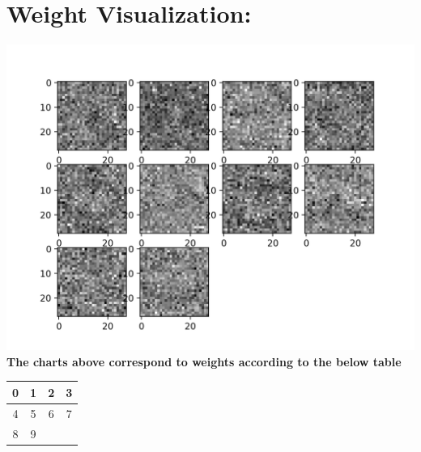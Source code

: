 \documentclass[12pt, letterpaper, notitlepage, twoside]{article}
\theoremstyle{definition}
\theoremstyle{plain}
\begin{document}
\section{Weight Visualization:}
\begin{center}
    \includegraphics{Imgs/Wgray.png}
    \textbf{The charts above correspond to weights according to the below table}
    \begin{tabular}{| c | c | c | c |}
    \hline
        0 & 1 & 2 & 3 \\
    \hline
        4 & 5 & 6 & 7 \\
    \hline
        8 & 9 & & \\
    \hline
    \end{tabular}
\end{center}
\end{document}
